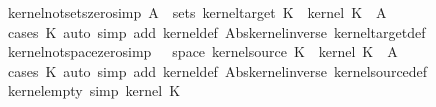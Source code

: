 \begin{isabellebody}
\isanewline
{}\isamarkupfalse%
\ kernel{\isacharunderscore}{\kern0pt}not{\isacharunderscore}{\kern0pt}sets{\isacharunderscore}{\kern0pt}zero{\isacharbrackleft}{\kern0pt}simp{\isacharbrackright}{\kern0pt}{\isacharcolon}{\kern0pt}\ {\isachardoublequoteopen}A{\isacharprime}{\kern0pt}\ {\isasymnotin}\ sets\ {\isacharparenleft}{\kern0pt}kernel{\isacharunderscore}{\kern0pt}target\ K{\isacharparenright}{\kern0pt}\ {\isasymLongrightarrow}\ kernel\ K\ {\isasymomega}\ A{\isacharprime}{\kern0pt}\ {\isacharequal}{\kern0pt}\ {}{\isachardoublequoteclose}\isanewline
%
\isadelimproof
\ \ %
\endisadelimproof
%
\isatagproof
{}\isamarkupfalse%
\ {\isacharparenleft}{\kern0pt}cases\ K{\isacharparenright}{\kern0pt}\ {\isacharparenleft}{\kern0pt}auto\ simp\ add{\isacharcolon}{\kern0pt}\ kernel{\isacharunderscore}{\kern0pt}def\ Abs{\isacharunderscore}{\kern0pt}kernel{\isacharunderscore}{\kern0pt}inverse\ kernel{\isacharunderscore}{\kern0pt}target{\isacharunderscore}{\kern0pt}def{\isacharparenright}{\kern0pt}%
\endisatagproof
{\isafoldproof}%
%
\isadelimproof
\isanewline
%
\endisadelimproof
\isanewline
{}\isamarkupfalse%
\ kernel{\isacharunderscore}{\kern0pt}not{\isacharunderscore}{\kern0pt}space{\isacharunderscore}{\kern0pt}zero{\isacharbrackleft}{\kern0pt}simp{\isacharbrackright}{\kern0pt}{\isacharcolon}{\kern0pt}\ {\isachardoublequoteopen}{\isasymomega}\ {\isasymnotin}\ space\ {\isacharparenleft}{\kern0pt}kernel{\isacharunderscore}{\kern0pt}source\ K{\isacharparenright}{\kern0pt}\ {\isasymLongrightarrow}\ kernel\ K\ {\isasymomega}\ A{\isacharprime}{\kern0pt}\ {\isacharequal}{\kern0pt}\ {}{\isachardoublequoteclose}\isanewline
%
\isadelimproof
\ \ %
\endisadelimproof
%
\isatagproof
{}\isamarkupfalse%
\ {\isacharparenleft}{\kern0pt}cases\ K{\isacharparenright}{\kern0pt}\ {\isacharparenleft}{\kern0pt}auto\ simp\ add{\isacharcolon}{\kern0pt}\ kernel{\isacharunderscore}{\kern0pt}def\ Abs{\isacharunderscore}{\kern0pt}kernel{\isacharunderscore}{\kern0pt}inverse\ kernel{\isacharunderscore}{\kern0pt}source{\isacharunderscore}{\kern0pt}def{\isacharparenright}{\kern0pt}%
\endisatagproof
{\isafoldproof}%
%
\isadelimproof
\isanewline
%
\endisadelimproof
\isanewline
{}\isamarkupfalse%
\ kernel{\isacharunderscore}{\kern0pt}empty\ {\isacharbrackleft}{\kern0pt}simp{\isacharbrackright}{\kern0pt}{\isacharcolon}{\kern0pt}\ {\isachardoublequoteopen}kernel\ K\ {\isasymomega}\ {\isacharbraceleft}{\kern0pt}{\isacharbraceright}{\kern0pt}\ {\isacharequal}{\kern0pt}\ {}{\isachardoublequoteclose}\isanewline

\end{isabellebody}
